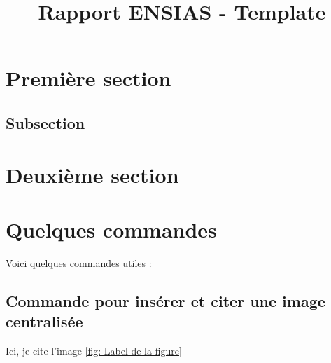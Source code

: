 \documentclass{rapportENSIAS}
\title{Rapport ENSIAS - Template} %
\begin{document}




        
\fairemarges %
\fairepagedegarde %
\tabledematieres %


\section{Première section} 

\lipsum[3-4]%

\subsection{Subsection}

\lipsum[3-4] %

\section{Deuxième section}

\lipsum[3-5] %




\newpage %
\section{Quelques commandes}

Voici quelques commandes utiles :

\subsection{Commande pour insérer et citer une image centralisée}

Ici, je cite l'image \ref{fig: Label de la figure}
\end{document}
